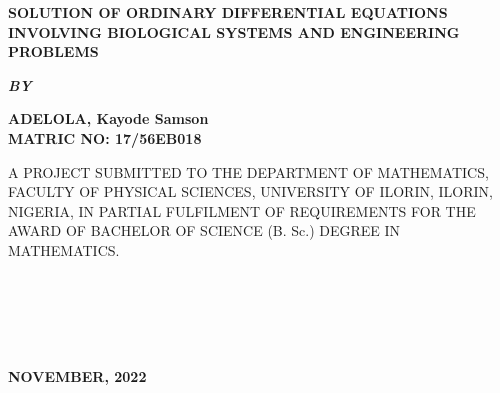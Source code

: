 \documentclass[11pt]{report}
\newcommand{\sps}{\\[0.2cm]}
\newcommand{\bt}[1]{\textbf{#1}}
\begin{document}
	
	\clearpage
	\thispagestyle{empty}
	\begin{center}
		\Large \bt{SOLUTION OF ORDINARY DIFFERENTIAL EQUATIONS INVOLVING BIOLOGICAL SYSTEMS AND ENGINEERING PROBLEMS}
	\end{center}

	\hspace{7cm}
	
	\begin{center}
		\textbf{\textit{BY}}
	\end{center}

	\hspace{5cm}
	
	\begin{center}
		\large \textbf{ADELOLA, Kayode Samson
			\\
			MATRIC NO: 17/56EB018}
	\end{center}
	\hspace{9cm}
	\begin{center}
		A PROJECT SUBMITTED TO THE DEPARTMENT OF MATHEMATICS, FACULTY OF PHYSICAL SCIENCES, UNIVERSITY OF ILORIN, ILORIN, NIGERIA, IN PARTIAL FULFILMENT OF REQUIREMENTS FOR THE AWARD OF BACHELOR OF SCIENCE (B. Sc.) DEGREE IN MATHEMATICS.
	\end{center}
	~~~~~\\\sps
	\hspace{7cm}
	~~~~~\\\sps
	\begin{center}
		\textbf{NOVEMBER, 2022}
	\end{center}

	\newpage
\end{document}
